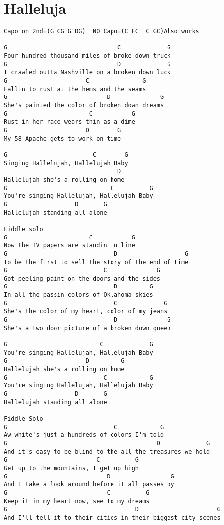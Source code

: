 \documentclass[leqno]{memoir}
\begin{document}
\chapter{Halleluja}
\begin{verbatim}
Capo on 2nd=(G CG G DG)  NO Capo=(C FC  C GC)Also works

G                               C             G
Four hundred thousand miles of broke down truck
G                               D             G
I crawled outta Nashville on a broken down luck
G                      C               G
Fallin to rust at the hems and the seams
G                            D              G
She's painted the color of broken down dreams
G                       C           G
Rust in her race wears thin as a dime
G                      D        G
My 58 Apache gets to work on time

G                        C        G
Singing Hallelujah, Hallelujah Baby
                                D
Hallelujah she's a rolling on home
G                             C          G
You're singing Hallelujah, Hallelujah Baby
G                   D       G
Hallelujah standing all alone

Fiddle solo
G                       C           G
Now the TV papers are standin in line
G                              D                   G
To be the first to sell the story of the end of time
G                           C              G
Got peeling paint on the doors and the sides
G                              D         G
In all the passin colors of Oklahoma skies
G                              C             G
She's the color of my heart, color of my jeans
G                              D              G
She's a two door picture of a broken down queen

G                          C             G
You're singing Hallelujah, Hallelujah Baby
G                      D         G
Hallelujah she's a rolling on home
G                           C            G
You're singing Hallelujah, Hallelujah Baby
G                   D       G
Hallelujah standing all alone

Fiddle Solo
G                              C            G
Aw white's just a hundreds of colors I'm told
G                                          D             G
And it's easy to be blind to the all the treasures we hold
G                         C          G
Get up to the mountains, I get up high
G                            D                 G
And I take a look around before it all passes by
G                            C          G
Keep it in my heart now, see to my dreams
G                                    D                      G 
And I'll tell it to their cities in their biggest city scenes


\end{verbatim}
\end{document}
